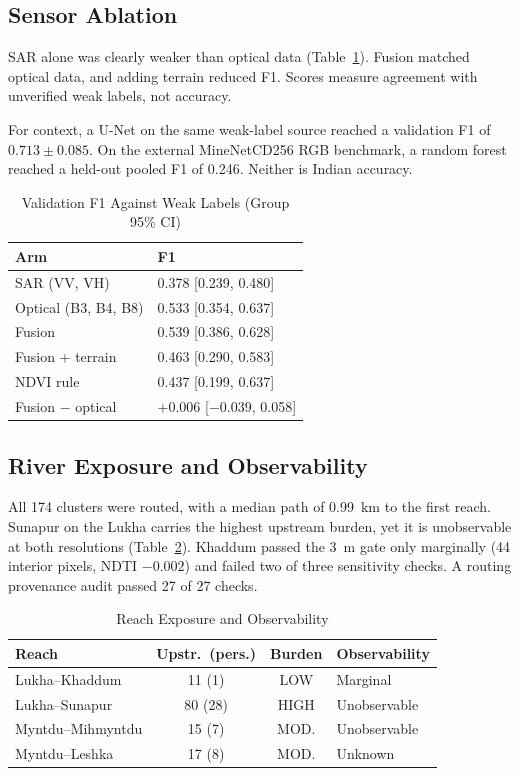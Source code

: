 \documentclass[conference]{IEEEtran}
\begin{document}
\subsection{Sensor Ablation}
SAR alone was clearly weaker than optical data (Table~\ref{tab:abl}). Fusion matched optical data, and adding terrain reduced F1. Scores measure agreement with unverified weak labels, not accuracy.

For context, a U-Net on the same weak-label source reached a validation F1 of $0.713\pm0.085$. On the external MineNetCD256 RGB benchmark, a random forest reached a held-out pooled F1 of 0.246. Neither is Indian accuracy.

\begin{table}[t]
\caption{Validation F1 Against Weak Labels (Group 95\% CI)}
\label{tab:abl}
\centering
\begin{tabular}{@{}ll@{}}
\toprule
Arm & F1 \\
\midrule
SAR (VV, VH) & 0.378 [0.239, 0.480] \\
Optical (B3, B4, B8) & 0.533 [0.354, 0.637] \\
Fusion & 0.539 [0.386, 0.628] \\
Fusion + terrain & 0.463 [0.290, 0.583] \\
NDVI rule & 0.437 [0.199, 0.637] \\
\midrule
Fusion $-$ optical & +0.006 [$-0.039$, 0.058] \\
\bottomrule
\end{tabular}
\end{table}

\subsection{River Exposure and Observability}
All 174 clusters were routed, with a median path of 0.99~km to the first reach. Sunapur on the Lukha carries the highest upstream burden, yet it is unobservable at both resolutions (Table~\ref{tab:river}). Khaddum passed the 3~m gate only marginally (44 interior pixels, NDTI $-0.002$) and failed two of three sensitivity checks. A routing provenance audit passed 27 of 27 checks.

\begin{table}[t]
\caption{Reach Exposure and Observability}
\label{tab:river}
\centering
\begin{tabular}{@{}lccl@{}}
\toprule
Reach & Upstr.\ (pers.) & Burden & Observability \\
\midrule
Lukha--Khaddum & 11 (1) & LOW & Marginal \\
Lukha--Sunapur & 80 (28) & HIGH & Unobservable \\
Myntdu--Mihmyntdu & 15 (7) & MOD. & Unobservable \\
Myntdu--Leshka & 17 (8) & MOD. & Unknown \\
\bottomrule
\end{tabular}
\end{table}
\end{document}
